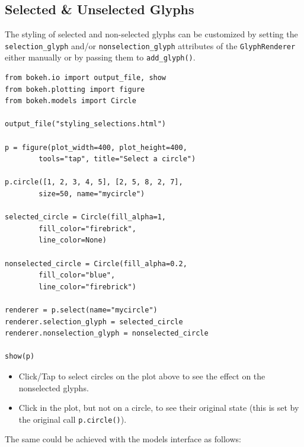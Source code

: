 \documentclass[a4paper,12pt]{article}
\begin{document}
\subsection*{Selected \& Unselected Glyphs}
The styling of selected and non-selected glyphs can be customized by setting the \texttt{selection\_glyph} and/or \texttt{nonselection\_glyph} attributes of the \texttt{GlyphRenderer} either manually or by passing them to \texttt{add\_glyph()}.

\begin{framed}
	\begin{verbatim}
from bokeh.io import output_file, show
from bokeh.plotting import figure
from bokeh.models import Circle

output_file("styling_selections.html")

p = figure(plot_width=400, plot_height=400, 
        tools="tap", title="Select a circle")
        
p.circle([1, 2, 3, 4, 5], [2, 5, 8, 2, 7], 
        size=50, name="mycircle")

selected_circle = Circle(fill_alpha=1, 
        fill_color="firebrick", 
        line_color=None)
        
nonselected_circle = Circle(fill_alpha=0.2, 
        fill_color="blue", 
        line_color="firebrick")

renderer = p.select(name="mycircle")
renderer.selection_glyph = selected_circle
renderer.nonselection_glyph = nonselected_circle

show(p)

\end{verbatim}
\end{framed}

\begin{itemize}

\item Click/Tap to select circles on the plot above to see the effect on the nonselected glyphs.

\item Click in the plot, but not on a circle, to see their original state (this is set by the original call \texttt{p.circle()}).
\end{itemize}

The same could be achieved with the models interface as follows:
\end{document}
